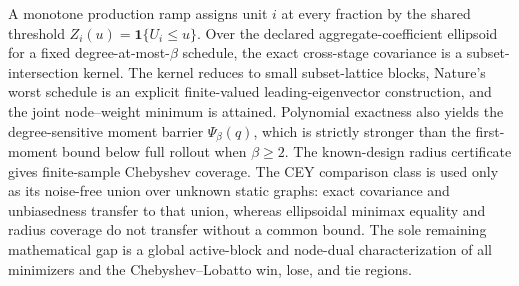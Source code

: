 A monotone production ramp assigns unit \(i\) at every fraction by the shared threshold \(Z_i(u)=\mathbf 1\{U_i\le u\}\).  Over the declared aggregate-coefficient ellipsoid for a fixed degree-at-most-\(\beta\) schedule, the exact cross-stage covariance is a subset-intersection kernel.  The kernel reduces to small subset-lattice blocks, Nature's worst schedule is an explicit finite-valued leading-eigenvector construction, and the joint node--weight minimum is attained.  Polynomial exactness also yields the degree-sensitive moment barrier \(\Psi_\beta(q)\), which is strictly stronger than the first-moment bound below full rollout when \(\beta\ge2\).  The known-design radius certificate gives finite-sample Chebyshev coverage.  The CEY comparison class is used only as its noise-free union over unknown static graphs: exact covariance and unbiasedness transfer to that union, whereas ellipsoidal minimax equality and radius coverage do not transfer without a common bound.  The sole remaining mathematical gap is a global active-block and node-dual characterization of all minimizers and the Chebyshev--Lobatto win, lose, and tie regions.